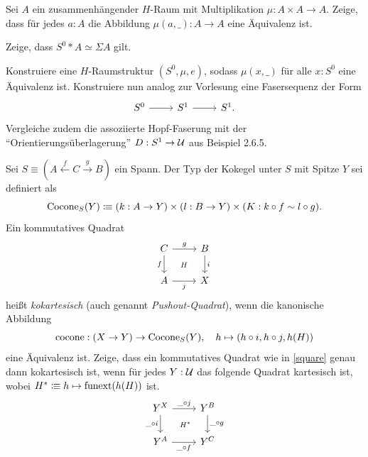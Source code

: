 \documentclass{hott-übung}
\begin{document}
\setcounter{blattnummer}{11}
\setcounter{aufgabennummer}{0}

\blatt

\aufgabe{}
Sei \(A\) ein zusammenhängender \(H\)-Raum mit Multiplikation \(\mu : A \times A \to A\).
Zeige, dass für jedes \(a : A\) die Abbildung \(\mu(a,\_) : A \to A\) eine Äquivalenz ist.

\aufgabe{}
Zeige, dass \(S^0 \ast A \simeq \Sigma A\) gilt.

Konstruiere eine \(H\)-Raumstruktur \((S^0,\mu,e)\), sodass \(\mu(x,\_)\) für alle \(x:S^0\) eine Äquivalenz ist. Konstruiere nun analog zur Vorlesung eine Fasersequenz der Form
\[\begin{tikzcd}S^0 \arrow[r] & S^1 \arrow[r] & S^1.\end{tikzcd}\]
Vergleiche zudem die assoziierte Hopf-Faserung mit der \enquote{Orientierungsüberlagerung} \(D : S^1 \to \mathcal{U}\) aus Beispiel 2.6.5.

\aufgabe{}
Sei \(S\equiv(A \xleftarrow{f} C \xrightarrow{g} B)\) ein Spann.
Der Typ der Kokegel unter \(S\) mit Spitze \(Y\) sei definiert als
\[\mathrm{Cocone}_S(Y) \vcentcolon\mspace{-1.2mu}\equiv (k : A \to Y) \times (l : B \to Y) \times (K : k\circ f \sim l \circ g).\]
Ein kommutatives Quadrat
\begin{equation}
  \label{square}
  \begin{tikzcd}
  	C & B \\
  	A & X
  	\arrow["g", from=1-1, to=1-2]
  	\arrow["f"', from=1-1, to=2-1]
  	\arrow["H"{description}, draw=none, from=1-1, to=2-2]
  	\arrow["i", from=1-2, to=2-2]
  	\arrow["j"', from=2-1, to=2-2]
  \end{tikzcd}
\end{equation}
heißt \emph{kokartesisch} (auch genannt \emph{Pushout-Quadrat}), wenn die kanonische Abbildung
\[\mathrm{cocone} : (X \to Y) \to \mathrm{Cocone}_S(Y), \quad h \mapsto (h\circ i,h\circ j,h(H))\]
eine Äquivalenz ist.
Zeige, dass ein kommutatives Quadrat wie in \ref{square} genau dann kokartesisch ist, wenn für jedes \(Y : \mathcal{U}\) das folgende Quadrat kartesisch ist, wobei \(H^*\vcentcolon\mspace{-1.2mu}\equiv h \mapsto \mathrm{funext}(h(H))\) ist.
\[\begin{tikzcd}
	{Y^X} & {Y^B} \\
	{Y^A} & {Y^C}
	\arrow["{\_\circ j}", from=1-1, to=1-2]
	\arrow["{\_\circ i}"', from=1-1, to=2-1]
	\arrow["{\_\circ g}", from=1-2, to=2-2]
	\arrow["{H^*}"{description}, draw=none, from=2-1, to=1-2]
	\arrow["{\_\circ f}"', from=2-1, to=2-2]
\end{tikzcd}\]
\end{document}
